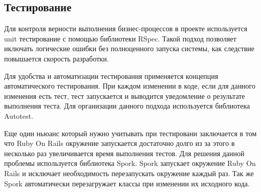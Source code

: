 \subsection{Тестирование}
Для контроля верности выполнения бизнес-процессов в проекте используется unit
тестирование с помощью библиотеки RSpec. Такой подход позволяет иключать
логические ошибки без полноценного запуска системы, как следствие повышается
скорость разработки.

Для удобства и автоматизации тестирования применяется концепция автоматического
тестирования. При каждом изменении в коде, если для данного изменения есть тест,
тест запускается и выводится уведомление о результате выполнения теста. Для
организации данного подхода используется библиотека Autotest.

Еще один ньюанс который нужно учитывать при тестировани заключается в том что
Ruby On Rails окружение запускается достаточно долго из за этого в несколько раз
увеличивается время выполнения тестов. Для решения данной проблемы используется
библиотека Spork. Spork запускает окружение Ruby On Rails и исключает
необходимость перезапускать окружение каждый раз. Так же Spork автоматически
перезагружает классы при изменении их исходного кода.